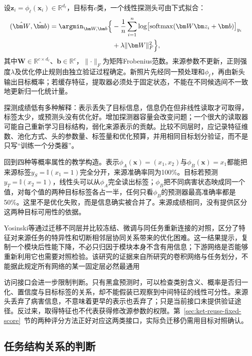 设$\bm z_i=\phi_\ell(\bm x_i)\in\mathbb R^{d_\ell}$，目标有$c$类，一个线性探测头可由下式拟合：
\begin{equation}
  \begin{aligned}
    (\hat{\bm W},\hat{\bm b})
    =\argmin_{\bm W,\bm b}\Bigl\{
    &-\frac{1}{n}\sum_{i=1}^{n}
    \log\bigl[\operatorname{softmax}
    (\bm W\bm z_i+\bm b)\bigr]_{y_i}\\
    &+\lambda\lVert\bm W\rVert_F^2\Bigr\},
  \end{aligned}
  \label{eq:ket-reuse-linear-probe}
\end{equation}
其中$\bm W\in\mathbb R^{c\times d_\ell}$、$\bm b\in\mathbb R^c$，$\lVert\cdot\rVert_F$为矩阵Frobenius范数。来源参数不更新，正则强度$\lambda$及优化停止规则由独立验证过程确定。新照片先经同一预处理和$\phi_\ell$，再由新头输出目标概率；若缓存特征，提取器必须处于固定状态，不能在不同候选间不一致地更新归一化统计量。

探测成绩低有多种解释：表示丢失了目标信息，信息仍在但非线性读取才可取得，标签太少，或预测头没有优化好。增加探测器容量会改变问题；一个很大的读取器可能自己重新学习目标结构，弱化来源表示的贡献。比较不同层时，应记录特征维数、池化方式、头的参数量、标签量和优化预算，并用相同目标划分验证，而不是只写“训练一个分类器”。

回到四种等概率属性的教学构造。表示$\phi_A(\bm x)=(x_1,x_2)$与$\phi_B(\bm x)=x_1$都能把来源标签$y_S=\mathbb I(x_1=1)$完全分开，来源准确率同为100\%。目标若预测$y_T=\mathbb I(x_2=1)$，线性头可以从$\phi_A$完全读出标签；$\phi_B$把不同病害状态映成同一个值，对每个值的两种目标标签各占一半，任何只看$\phi_B$的预测器最高准确率都是50\%。这里不是优化失败，而是信息确实被合并了。来源成绩相同，没有提供区分这两种目标可用性的依据。

Yosinski等通过迁移不同层并比较冻结、微调与同任务重新连接的对照，区分了特征对来源任务的特异性和切断相邻层协同关系带来的优化困难。这一结果提示，复制一个模块后性能下降，不必只归因于模块本身不含有用信息；下游网络是否能够重新利用它也需要对照检验。该研究的证据来自所研究的卷积网络与任务划分，不能据此规定所有网络的某一固定层必然最通用

访问接口会进一步限制判断。只有黑盒预测时，可以检查类别含义、概率是否归一化、置信度与目标标签的关系，却不能假装已观察到中间特征的线性可分性。来源头丢弃了病害信息，不意味着更早的表示也丢弃了；只是当前接口未提供验证途径。反过来，取得特征也不代表获得修改源参数的权限。第~\ref{sec:ket-reuse-fixed-score}~节的两种评分方法正好对应这两类接口，实际负迁移仍需用目标对照确认。

\subsection{任务结构关系的判断}
\label{sec:ket-reuse-task-relations}

